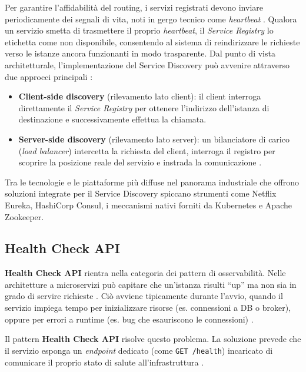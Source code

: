 Per garantire l'affidabilità del routing, i servizi registrati devono inviare periodicamente dei segnali di vita, noti in gergo tecnico come \textit{heartbeat} \cite{bff_discovery}. Qualora un servizio smetta di trasmettere il proprio \textit{heartbeat}, il \textit{Service Registry} lo etichetta come non disponibile, consentendo al sistema di reindirizzare le richieste verso le istanze ancora funzionanti in modo trasparente.
Dal punto di vista architetturale, l'implementazione del Service Discovery può avvenire attraverso due approcci principali \cite{medium_microservices_patterns_2020}:
\begin{itemize}
    \item \textbf{Client-side discovery} (rilevamento lato client): il client interroga direttamente il \textit{Service Registry} per ottenere l'indirizzo dell'istanza di destinazione e successivamente effettua la chiamata.
    \item \textbf{Server-side discovery} (rilevamento lato server): un bilanciatore di carico (\textit{load balancer}) intercetta la richiesta del client, interroga il registro per scoprire la posizione reale del servizio e instrada la comunicazione \cite{bff_discovery, medium_microservices_patterns_2020}.
\end{itemize}

Tra le tecnologie e le piattaforme più diffuse nel panorama industriale che offrono soluzioni integrate per il Service Discovery spiccano strumenti come Netflix Eureka, HashiCorp Consul, i meccanismi nativi forniti da Kubernetes \cite{medium_microservices_patterns_2020} e Apache Zookeeper.

\subsection*{Health Check API}
\textbf{Health Check API} rientra nella categoria dei pattern di osservabilità. Nelle architetture a microservizi può capitare che un'istanza risulti “up” ma non sia in grado di servire richieste \cite{Richardson2018}. Ciò avviene tipicamente durante l'avvio, quando il servizio impiega tempo per inizializzare risorse (es. connessioni a DB o broker), oppure per errori a runtime (es. bug che esauriscono le connessioni) \cite{RichardsonHealthCheckAPI}.

Il pattern \textbf{Health Check API} risolve questo problema. La soluzione prevede che il servizio esponga un \textit{endpoint} dedicato (come \texttt{GET /health}) incaricato di comunicare il proprio stato di salute all'infrastruttura \cite{Richardson2018}. 

